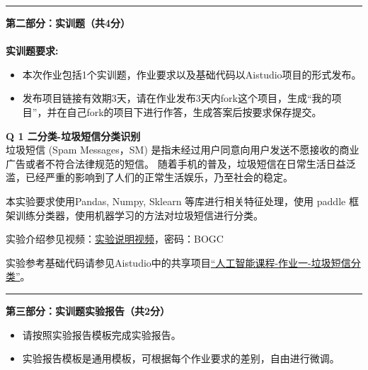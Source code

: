 \documentclass[a4paper, 11pt]{article}
\newenvironment{problem}[2][Q]
    { \begin{mdframed}[backgroundcolor=gray!20] \textbf{#1 #2} \\}
    {  \end{mdframed}}
\begin{document}
\begin{CJK}{UTF8}{gbsn}
\newpage
\noindent\rule{7in}{1pt}
\textbf{第二部分：实训题（共4分）}
\\ \\
\textbf{实训题要求:}
\begin{itemize}
    \item 本次作业包括1个实训题，作业要求以及基础代码以Aistudio项目的形式发布。
    \item 发布项目链接有效期3天，请在作业发布3天内fork这个项目，生成``我的项目''，并在自己fork的项目下进行作答，生成答案后按要求保存提交。
\end{itemize}


\begin{problem}{1 二分类-垃圾短信分类识别}

    垃圾短信 (Spam Messages，SM) 是指未经过用户同意向用户发送不愿接收的商业广告或者不符合法律规范的短信。
随着手机的普及，垃圾短信在日常生活日益泛滥，已经严重的影响到了人们的正常生活娱乐，乃至社会的稳定。

本实验要求使用Pandas, Numpy, Sklearn 等库进行相关特征处理，使用 paddle 框架训练分类器，使用机器学习的方法对垃圾短信进行分类。

实验介绍参见视频：\href{https://meeting.tencent.com/crm/2pdvgbPj1e}{实验说明视频}，密码：BOGC

实验参考基础代码请参见Aistudio中的共享项目\href{https://aistudio.baidu.com/studio/project/partial/verify/8926460/4afb03c8043d4be7803444106b6997cf}{“人工智能课程-作业一-垃圾短信分类”}。

\end{problem}

\noindent\rule{7in}{1pt}
\textbf{第三部分：实训题实验报告（共2分）}
\begin{itemize}
    \item 请按照实验报告模板完成实验报告。
    \item 实验报告模板是通用模板，可根据每个作业要求的差别，自由进行微调。
\end{itemize}

\end{CJK}
\end{document}
